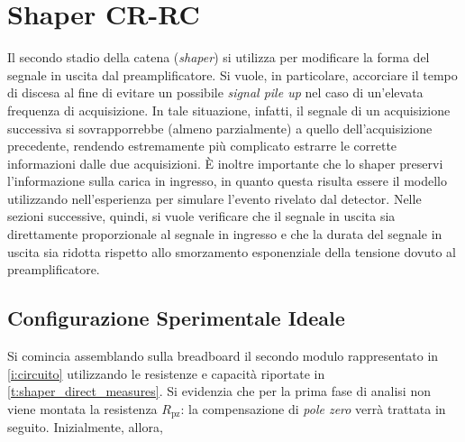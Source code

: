 \documentclass[a4paper,11pt]{article} %
\begin{document}

\section{Shaper CR-RC}\label{s:shaper} 

Il secondo stadio della catena (\textit{shaper}) si utilizza per modificare la
forma del segnale in uscita dal preamplificatore. Si vuole, in particolare, accorciare il tempo di discesa al fine di
evitare un possibile \textit{signal pile up} nel caso di un'elevata frequenza di acquisizione. In tale situazione,
infatti, il segnale di un acquisizione successiva si sovrapporrebbe (almeno parzialmente) a quello dell'acquisizione
precedente, rendendo estremamente più complicato estrarre le corrette informazioni dalle due acquisizioni. È inoltre
importante che lo shaper preservi l'informazione sulla carica in ingresso, in quanto questa risulta essere il modello
utilizzando nell'esperienza per simulare l'evento rivelato dal detector. Nelle sezioni successive, quindi, si vuole
verificare che il segnale in uscita sia direttamente proporzionale al segnale in ingresso e che la durata del segnale in
uscita sia ridotta rispetto allo smorzamento esponenziale della tensione dovuto al preamplificatore. 


\subsection{Configurazione Sperimentale Ideale}\label{s:shaper_config_ideale}

Si comincia assemblando sulla breadboard il secondo modulo rappresentato in \autoref{i:circuito} utilizzando le
resistenze e capacità riportate in \autoref{t:shaper_direct_measures}. Si evidenzia che per la prima fase di analisi non
viene montata la resistenza $R_{\text{pz}}$: la compensazione di \textit{pole zero} verrà trattata in seguito.
Inizialmente, allora,
\end{document}
